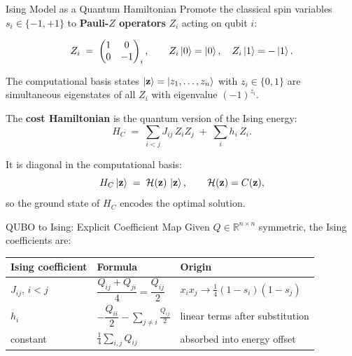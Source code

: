 \documentclass{beamer}
\begin{document}
\begin{frame}

\begin{frame}{Ising Model as a Quantum Hamiltonian}
Promote the classical spin variables $s_i\in\{-1,+1\}$ to
\textbf{Pauli-$Z$ operators} $Z_i$ acting on qubit $i$:

\[
Z_i \;=\; \begin{pmatrix}1&0\\0&-1\end{pmatrix}_i,\qquad
Z_i\ket{0} = \ket{0},\quad Z_i\ket{1}=-\ket{1}.
\]

The computational basis states $\ket{\mathbf{z}} =
\ket{z_1,\dots,z_n}$ with $z_i\in\{0,1\}$ are simultaneous
eigenstates of all $Z_i$ with eigenvalue $(-1)^{z_i}$.

\medskip

The \textbf{cost Hamiltonian} is the quantum version of the Ising energy:
\[
\boxed{
H_C \;=\; \sum_{i<j} J_{ij}\,Z_i Z_j \;+\; \sum_i h_i\,Z_i.}
\]

It is diagonal in the computational basis:
\[
H_C\ket{\mathbf{z}} \;=\; \mathcal{H}(\mathbf{z})\,\ket{\mathbf{z}},
\qquad \mathcal{H}(\mathbf{z}) = C(\mathbf{z}),
\]
so the ground state of $H_C$ encodes the optimal solution.
\end{frame}


\begin{frame}{QUBO to Ising: Explicit Coefficient Map}
Given $Q\in\mathbb{R}^{n\times n}$ symmetric, the Ising coefficients are:

\medskip

\begin{center}
\begin{tabular}{lll}
\hline
\textbf{Ising coefficient} & \textbf{Formula} & \textbf{Origin} \\
\hline
$J_{ij}$, $i<j$ &
$\dfrac{Q_{ij}+Q_{ji}}{4} = \dfrac{Q_{ij}}{2}$ &
$x_ix_j \to \tfrac{1}{4}(1-s_i)(1-s_j)$\\[8pt]
$h_i$ &
$-\dfrac{Q_{ii}}{2} - \displaystyle\sum_{j\neq i}\frac{Q_{ij}}{2}$ &
linear terms after substitution \\[8pt]
constant & $\displaystyle\frac{1}{4}\sum_{i,j}Q_{ij}$ & absorbed into energy offset \\
\hline
\end{tabular}
\end{center}

\medskip


\end{frame}
\end{frame}
\end{document}
